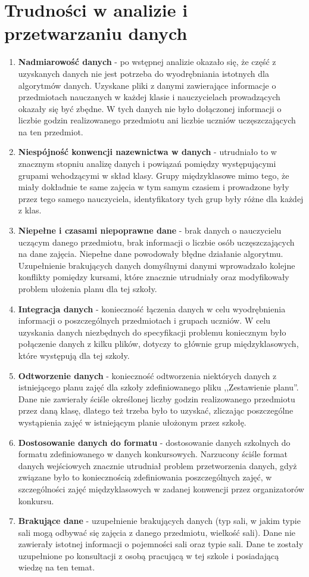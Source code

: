 \section{Trudności w analizie i przetwarzaniu danych}
\begin{enumerate}
\item \textbf{Nadmiarowość danych} - po wstępnej analizie okazało się, że część z uzyskanych danych nie jest potrzeba do wyodrębniania istotnych dla algorytmów danych. Uzyskane pliki z danymi zawierające informacje o przedmiotach nauczanych w każdej klasie i nauczycielach prowadzących okazały się być zbędne. W tych danych nie było dołączonej informacji o liczbie godzin realizowanego przedmiotu ani liczbie uczniów uczęszczających na ten przedmiot. 
\item \textbf{Niespójność konwencji nazewnictwa w danych} - utrudniało to w znacznym stopniu analizę danych i powiązań pomiędzy występującymi grupami wchodzącymi w skład klasy. Grupy międzyklasowe mimo tego, że miały dokładnie te same zajęcia w tym samym czasiem i prowadzone były przez tego samego nauczyciela, identyfikatory tych grup były różne dla każdej z klas.
\item \textbf{Niepełne i czasami niepoprawne dane} - brak danych o nauczycielu uczącym danego przedmiotu, brak informacji o liczbie osób uczęszczających na dane zajęcia. Niepełne dane powodowały błędne działanie algorytmu. Uzupełnienie brakujących danych domyślnymi danymi wprowadzało kolejne konflikty pomiędzy kursami, które znacznie utrudniały oraz modyfikowały problem ułożenia planu dla tej szkoły.
\item \textbf{Integracja danych} - konieczność łączenia danych w celu wyodrębnienia informacji o poszczególnych przedmiotach i grupach uczniów. W celu uzyskania danych niezbędnych do specyfikacji problemu koniecznym było połączenie danych z kilku plików, dotyczy to głównie grup międzyklasowych, które występują dla tej szkoły.
\item \textbf{Odtworzenie danych} - konieczność odtworzenia niektórych danych z istniejącego planu zajęć dla szkoły zdefiniowanego pliku ,,Zestawienie planu''. Dane nie zawierały ściśle określonej liczby godzin realizowanego przedmiotu przez daną klasę, dlatego też trzeba było to uzyskać, zliczając poszczególne wystąpienia zajęć w istniejącym planie ułożonym przez szkołę.
\item \textbf{Dostosowanie danych do formatu} - dostosowanie danych szkolnych do formatu zdefiniowanego w danych konkursowych. Narzucony ściśle format danych wejściowych znacznie utrudniał problem przetworzenia danych, gdyż związane było to koniecznością zdefiniowania poszczególnych zajęć, w szczególności zajęć międzyklasowych w zadanej konwencji przez organizatorów konkursu.
\item \textbf{Brakujące dane} - uzupełnienie brakujących danych (typ sali, w jakim typie sali mogą odbywać się zajęcia z danego przedmiotu, wielkość sali).  Dane nie zawierały istotnej informacji o pojemności sali oraz typie sali. Dane te zostały uzupełnione po konsultacji z osobą pracującą w tej szkole i posiadającą wiedzę na ten temat.
\end{enumerate}


